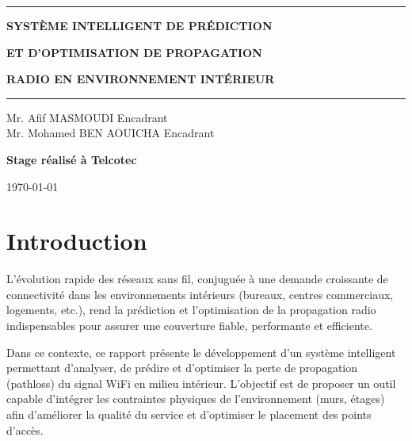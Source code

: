 \documentclass[12pt,a4paper]{article}
\begin{document}
\begin{titlepage}
    \vspace{1cm}
    
    \rule{0.8\textwidth}{2pt}
    
    \vspace{0.5cm}
    
    {\Large\textbf{SYSTÈME INTELLIGENT DE PRÉDICTION}}
    
    {\Large\textbf{ET D'OPTIMISATION DE PROPAGATION}}
    
    {\Large\textbf{RADIO EN ENVIRONNEMENT INTÉRIEUR}}
    
    \vspace{0.5cm}
    
    \rule{0.8\textwidth}{2pt}
    
    \vfill
    
    \begin{minipage}[t]{0.5\textwidth}
        \raggedright
        Mr. Afif MASMOUDI \hfill Encadrant\\
        Mr. Mohamed BEN AOUICHA \hfill Encadrant
    \end{minipage}
    
    \vspace{1cm}
    
    \textbf{Stage réalisé à Telcotec}
    
    \vspace{1cm}
    
    {\large\today}
    
\end{titlepage}

\newpage
\tableofcontents
\newpage

\section{Introduction}
L’évolution rapide des réseaux sans fil, conjuguée à une demande croissante de connectivité dans les environnements intérieurs (bureaux, centres commerciaux, logements, etc.), rend la prédiction et l’optimisation de la propagation radio indispensables pour assurer une couverture fiable, performante et efficiente.

Dans ce contexte, ce rapport présente le développement d’un système intelligent permettant d’analyser, de prédire et d’optimiser la perte de propagation (pathloss) du signal WiFi en milieu intérieur. L’objectif est de proposer un outil capable d’intégrer les contraintes physiques de l’environnement (murs, étages) afin d’améliorer la qualité du service et d’optimiser le placement des points d’accès.
\end{document}
